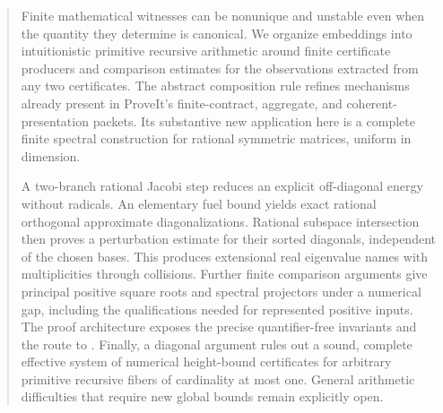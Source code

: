 \documentclass[11pt,a4paper]{article}
\theoremstyle{definition}
\theoremstyle{remark}\newtheorem{remark}[theorem]{Remark}
\newcommand{\code}[1]{\texttt{\detokenize{#1}}}
\begin{document}
\begin{abstract}
Finite mathematical witnesses can be nonunique and unstable even when the quantity they determine is canonical. We organize embeddings into intuitionistic primitive recursive arithmetic around finite certificate producers and comparison estimates for the observations extracted from any two certificates. The abstract composition rule refines mechanisms already present in ProveIt's finite-contract, aggregate, and coherent-presentation packets. Its substantive new application here is a complete finite spectral construction for rational symmetric matrices, uniform in dimension.

A two-branch rational Jacobi step reduces an explicit off-diagonal energy without radicals. An elementary fuel bound yields exact rational orthogonal approximate diagonalizations. Rational subspace intersection then proves a perturbation estimate for their sorted diagonals, independent of the chosen bases. This produces extensional real eigenvalue names with multiplicities through collisions. Further finite comparison arguments give principal positive square roots and spectral projectors under a numerical gap, including the qualifications needed for represented positive inputs. The proof architecture exposes the precise quantifier-free invariants and the route to \code{Prf PRAAx}. Finally, a diagonal argument rules out a sound, complete effective system of numerical height-bound certificates for arbitrary primitive recursive fibers of cardinality at most one. General arithmetic difficulties that require new global bounds remain explicitly open.
\end{abstract}
\tableofcontents
\newpage
{}












\end{document}

